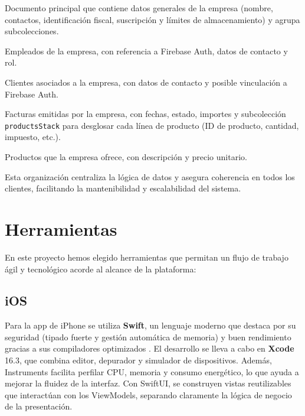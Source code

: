 \begin{large}
\begin{description}[leftmargin=3cm, style=nextline]
  \item[\texttt{businesses/\{businessId\}}] Documento principal que contiene datos generales de la empresa (nombre, contactos, identificación fiscal, suscripción y límites de almacenamiento) y agrupa subcolecciones.
  \item[\texttt{businesses/\{businessId\}/employees/\{employeeId\}}] Empleados de la empresa, con referencia a Firebase Auth, datos de contacto y rol.
  \item[\texttt{businesses/\{businessId\}/clients/\{clientId\}}] Clientes asociados a la empresa, con datos de contacto y posible vinculación a Firebase Auth.
  \item[\texttt{businesses/\{businessId\}/invoices/\{invoiceId\}}] Facturas emitidas por la empresa, con fechas, estado, importes y subcolección \texttt{productsStack} para desglosar cada línea de producto (ID de producto, cantidad, impuesto, etc.).
  \item[\texttt{businesses/\{businessId\}/products/\{productId\}}] Productos que la empresa ofrece, con descripción y precio unitario.
\end{description}

Esta organización centraliza la lógica de datos y asegura coherencia en todos los clientes, facilitando la mantenibilidad y escalabilidad del sistema.

\end{large}

\section{Herramientas}

\begin{large}

En este proyecto hemos elegido herramientas que permitan un flujo de trabajo ágil y tecnológico acorde al alcance de la plataforma:

\end{large}

\subsection{iOS}

\begin{large}

Para la app de iPhone se utiliza \textbf{Swift}, un lenguaje moderno que destaca por su seguridad (tipado fuerte y gestión automática de memoria) y buen rendimiento gracias a sus compiladores optimizados \cite{swift_lang2025}. El desarrollo se lleva a cabo en \textbf{Xcode} 16.3, que combina editor, depurador y simulador de dispositivos. Además, Instruments facilita perfilar CPU, memoria y consumo energético, lo que ayuda a mejorar la fluidez de la interfaz. Con SwiftUI, se construyen vistas reutilizables que interactúan con los ViewModels, separando claramente la lógica de negocio de la presentación.

\end{large}

